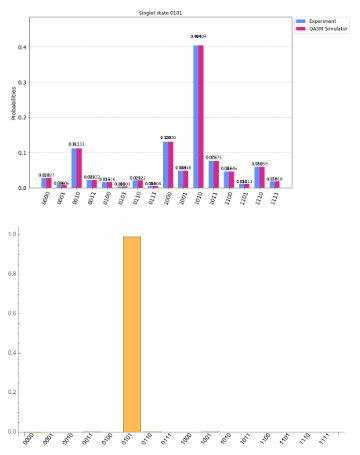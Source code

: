 \documentclass[10pt]{amsart}
\theoremstyle{definition}
\begin{document}
\begin{figure}[hbt]
    \begin{subfigure}{0.4\textwidth}
    \centering
    \includegraphics[width=0.9\linewidth]{smallt_inputSing1_quantum.png}
  \end{subfigure}
  \begin{subfigure}{0.4\textwidth}
    \centering
    \includegraphics[width=0.9\linewidth]{smallt_inputSing1_exact.pdf}
  \end{subfigure}
  

\end{figure}
\end{document}
